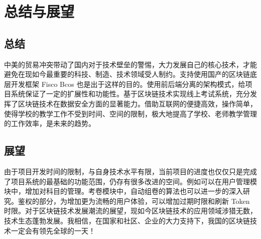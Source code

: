 \section{总结与展望}
\subsection{总结}
中美的贸易冲突带动了国内对于技术壁垒的警惕，大力发展自己的核心技术，才能避免在现如今最重要的科技、制造、技术领域受人制约。支持使用国产的区块链底层开发框架 Fisco Bcos 也是出于这样的目的。使用前后端分离的架构模式，给项目系统保证了一定的扩展性和功能性。基于区块链技术实现线上考试系统，充分发挥了区块链技术在数据安全方面的显著能力。借助互联网的便捷高效，操作简单，使得学校的教学工作不受到时间、空间的限制，极大地提高了学校、老师教学管理的工作效率，是未来的趋势。
\subsection{展望}
由于项目开发时间的限制，与自身技术水平有限，当前项目的进度也仅仅只是完成了项目系统的最基础的功能范围，仍存有很多改进的空间。例如可以在用户管理模块中，增加对科目的管理。考卷模块中，自动组卷的算法也可以进一步的深入研究。鉴权的部分，为增加更为流畅的用户体验，可以增加过期时限和刷新 Token 时限。对于区块链技术发展潮流的展望，现如今区块链技术的应用领域涉猎无数，技术生态蓬勃发展。我相信，在国家和社区、企业的大力支持下，我国的区块链技术一定会有领先全球的一天！